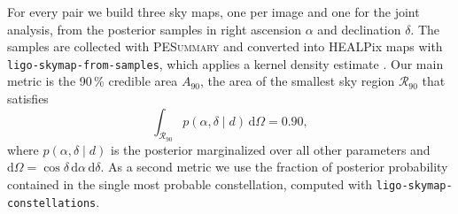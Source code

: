 \documentclass{aa}
\begin{document}
For every pair we build three sky maps, one per image and one for the joint
analysis, from the posterior samples in right ascension $\alpha$ and
declination $\delta$. The samples are collected with \textsc{PESummary}
\citep{PESummary} and converted into HEALPix maps \citep{Gorski2005} with
\texttt{ligo-skymap-from-samples}, which applies a kernel density estimate
\citep{SingerPrice2016}. Our main metric is the 90\,\% credible area
$A_{90}$, the area of the smallest sky region $\mathcal{R}_{90}$ that
satisfies
\begin{equation}
    \int_{\mathcal{R}_{90}} p(\alpha, \delta \mid d)\, \mathrm{d}\Omega = 0.90 ,
    \label{eq:A90}
\end{equation}
where $p(\alpha, \delta \mid d)$ is the posterior marginalized over all
other parameters and $\mathrm{d}\Omega = \cos\delta\,\mathrm{d}\alpha\,
\mathrm{d}\delta$. As a second metric we use the fraction of posterior
probability contained in the single most probable constellation, computed
with \texttt{ligo-skymap-constellations}.
\end{document}
